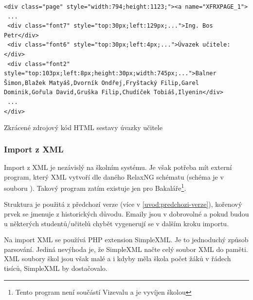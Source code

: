 \begin{code}[H]
  \begin{verbatim}
<div class="page" style="width:794;height:1123;"><a name="XFRXPAGE_1">
 ...
 <div class="font7" style="top:30px;left:129px;...">Ing. Bos Petr</div>
 <div class="font6" style="top:30px;left:4px;...">Úvazek učitele:</div>
 <div class="font2" style="top:103px;left:8px;height:30px;width:745px;...">Balner Šimon,Blažek Matyáš,Dvorník Ondřej,Fryštacký Filip,Garel Dominik,Gořula David,Gruška Filip,Chudíček Tobiáš,Ilyenin</div>
 ...
</div>
\end{verbatim}
\caption{Zkrácené zdrojový kód HTML sestavy úvazky učitele}
\end{code}


\subsubsection{Import z XML}
Import z XML je nezávislý na školním systému. Je však potřeba mít externí program, který XML vytvoří dle daného RelaxNG schématu (schéma je v souboru ).
Takový program zatím existuje jen pro Bakaláře\footnote{Tento program není součástí Vizevalu a je vyvíjen školou}.

Struktura je použitá z předchozí verze (více v \ref{uvod:predchozi-verze}), kořenový prvek se jmenuje  z historických důvodu. Emaily jsou v dobrovolné a pokud budou u některých studentů/učitelů chybět vygenerují se v dalším kroku importu.

Na import XML se používá PHP extension SimpleXML. Je to jednoduchý způsob parsování. Jediná nevýhoda je, že SimpleXML načte celý soubor XML do paměti. XML soubory škol jsou však malé a i kdyby měla škola počet žáků v řádech tisíců, SimpleXML by dostačovalo. 




